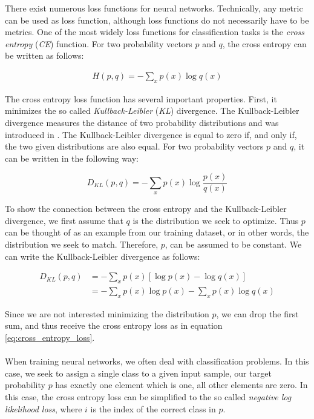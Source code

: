 There exist numerous loss functions for neural networks. Technically, any metric can be used as loss function, although loss functions do not necessarily have to be metrics. One of the most widely loss functions for classification tasks is the \textit{cross entropy} (\textit{CE}) function. For two  probability vectors $p$ and $q$, the cross entropy can be written as follows:

\begin{align}
H(p, q) = - \sum_{x} p(x) \log q(x)
\label{eq:cross_entropy_loss}
\end{align}

The cross entropy loss function has several important properties. First, it minimizes the so called \textit{Kullback-Leibler} (\textit{KL}) divergence. The Kullback-Leibler divergence measures the distance of two probability distributions and was introduced in \cite{kullback1951information}. The Kullback-Leibler divergence is equal to zero if, and only if, the two given distributions are also equal. For two probability vectors $p$ and $q$, it can be written in the following way:

\[
D_{KL}(p, q) = -\sum_{x} p(x) \log \frac{p(x)}{q(x)}
\]

To show the connection between the cross entropy and the Kullback-Leibler divergence, we first assume that $q$ is the distribution we seek to optimize. Thus $p$ can be thought of as an example from our training dataset, or in other words, the distribution we seek to match. Therefore, $p$, can be assumed to be constant. We can write the Kullback-Leibler divergence as follows: 

\begin{align*}
D_{KL}(p, q) &= - \sum_{x} p(x) \left[ \log p(x) - \log q(x) \right] \\
& = - \sum_{x} p(x) \log p(x) -\sum_{x} p(x) \log q(x)
\end{align*}

Since we are not interested minimizing the distribution $p$, we can drop the first sum, and thus receive the cross entropy loss as in equation \ref{eq:cross_entropy_loss}. \\ \\
When training neural networks, we often deal with classification problems. In this case, we seek to assign a single class to a given input sample, our target probability $p$ has exactly one element which is one, all other elements are zero. In this case, the cross entropy loss can be simplified to the so called \textit{negative log likelihood loss}, where $i$ is the index of the correct class in $p$. 

